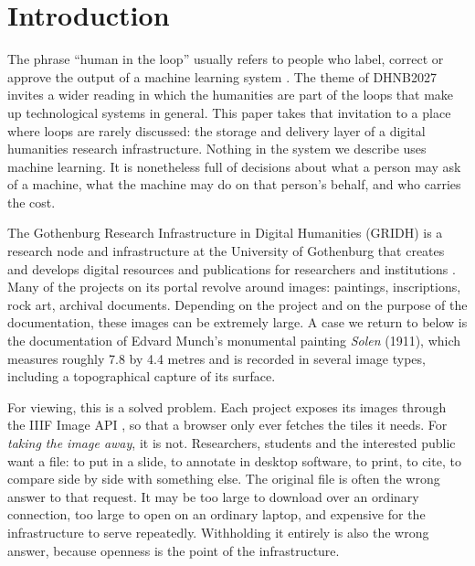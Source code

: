 \documentclass{dhnbpub}
\begin{document}
\maketitle

\section{Introduction}

The phrase ``human in the loop'' usually refers to people who label,
correct or approve the output of a machine learning system
\citep{mosqueira2023}. The theme of DHNB2027 invites a wider reading in
which the humanities are part of the loops that make up technological
systems in general. This paper takes that invitation to a place where
loops are rarely discussed: the storage and delivery layer of a digital
humanities research infrastructure. Nothing in the system we describe
uses machine learning. It is nonetheless full of decisions about what a
person may ask of a machine, what the machine may do on that person's
behalf, and who carries the cost.

The Gothenburg Research Infrastructure in Digital Humanities (GRIDH) is
a research node and infrastructure at the University of Gothenburg that
creates and develops digital resources and publications for researchers
and institutions \citep{gridh}. Many of the projects on its portal
revolve around images: paintings, inscriptions, rock art, archival
documents. Depending on the project and on the purpose of the
documentation, these images can be extremely large. A case we return to
below is the documentation of Edvard Munch's monumental painting
\emph{Solen} (1911), which measures roughly 7.8 by 4.4 metres and is
recorded in several image types, including a topographical capture of
its surface.

For viewing, this is a solved problem. Each project exposes its images
through the IIIF Image API \citep{iiif_image3, snydman2015}, so that a
browser only ever fetches the tiles it needs. For \emph{taking the
image away}, it is not. Researchers, students and the interested public
want a file: to put in a slide, to annotate in desktop software, to
print, to cite, to compare side by side with something else. The
original file is often the wrong answer to that request. It may be too
large to download over an ordinary connection, too large to open on an
ordinary laptop, and expensive for the infrastructure to serve
repeatedly. Withholding it entirely is also the wrong answer, because
openness is the point of the infrastructure.
\end{document}
